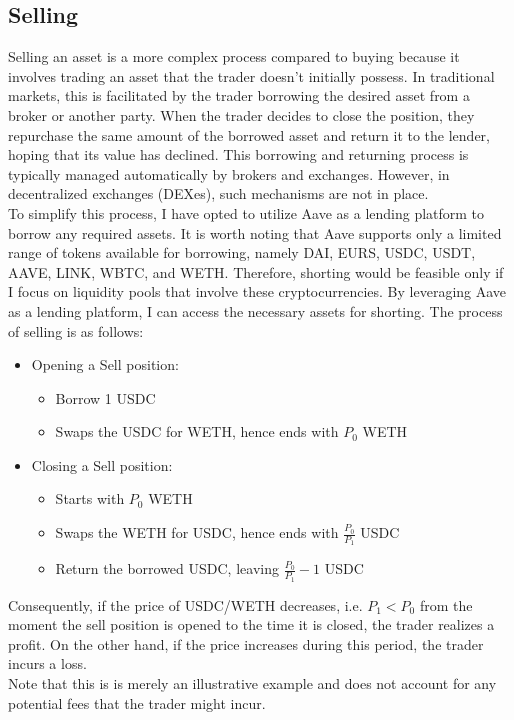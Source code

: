 \subsection{Selling}
Selling an asset is a more complex process compared to buying because it involves trading an asset that the trader doesn't initially possess. In traditional markets, this is facilitated by the trader borrowing the desired asset from a broker or another party. When the trader decides to close the position, they repurchase the same amount of the borrowed asset and return it to the lender, hoping that its value has declined. This borrowing and returning process is typically managed automatically by brokers and exchanges. However, in decentralized exchanges (DEXes), such mechanisms are not in place.
\\[5mm]
To simplify this process, I have opted to utilize Aave as a lending platform to borrow any required assets. It is worth noting that Aave supports only a limited range of tokens available for borrowing, namely DAI, EURS, USDC, USDT, AAVE, LINK, WBTC, and WETH. Therefore, shorting would be feasible only if I focus on liquidity pools that involve these cryptocurrencies. By leveraging Aave as a lending platform, I can access the necessary assets for shorting. The process of selling is as follows:
\begin{itemize}
    \item Opening a Sell position:\begin{itemize}
        \item Borrow 1 USDC
        \item Swaps the USDC for WETH, hence ends with $P_0$ WETH
    \end{itemize}
    \item Closing a Sell position:\begin{itemize}
        \item Starts with $P_0$ WETH
        \item Swaps the WETH for USDC, hence ends with $\frac{P_0}{P_1}$ USDC
        \item Return the borrowed USDC, leaving $\frac{P_0}{P_1} - 1$ USDC
    \end{itemize}
\end{itemize}
Consequently, if the price of USDC/WETH decreases, i.e. $P_1 < P_0$ from the moment the sell position is opened to the time it is closed, the trader realizes a profit. On the other hand, if the price increases during this period, the trader incurs a loss.
\\[5mm]
Note that this is is merely an illustrative example and does not account for any potential fees that the trader might incur.

